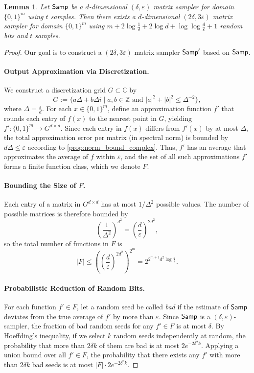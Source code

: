 \documentclass[10pt,a4paper]{article}
\newtheorem{lemma}[theorem]{Lemma}
\newcommand{\Z}{\mathbb{Z}}
\newcommand{\eps}{\varepsilon}
\newcommand{\1}{\mathbbm{1}}
\newcommand{\abs}[1]{\left|#1\right| }
\newcommand{\tuple}[1]{\left(#1\right)}
\newcommand{\zo}{\{0, 1\}}
\newcommand{\Smp}{\textup{\textsf{Samp}}}
\begin{document}
\begin{lemma}
    \label{lem:non_explicit_reduction}
    Let $\Smp$ be a $d$-dimensional $(\delta, \eps)$ matrix sampler for domain $\zo^m$ using $t$ samples. Then there exists a $d$-dimensional $(2\delta, 3\eps)$ matrix sampler for domain $\zo^m$ using $m + 2 \log \frac{1}{\delta} + 2 \log d + \log \log \frac{d}{\eps} + 1$ random bits and $t$ samples.
\end{lemma}
\begin{proof}
Our goal is to construct a $(2\delta, 3\eps)$ matrix sampler $\Smp'$ based on $\Smp$.
\paragraph{Output Approximation via Discretization.} 

We construct a discretization grid \( G \subset \mathbb{C} \) by \[
    G := \{a\Delta + b\Delta i \mid a, b \in \Z \text{ and } \abs{a}^2 + \abs{b}^2 \le \Delta^{-2}\},
\]
where $\Delta = \frac{\eps}{d}$.
For each \( x \in \{0,1\}^m \), define an approximation function \( f' \) that rounds each entry of \( f(x) \) to the nearest point in \( G \), yielding \( f' : \{0,1\}^m \to G^{d \times d} \). Since each entry in \( f(x) \) differs from \( f'(x) \) by at most \( \Delta \), the total approximation error per matrix (in spectral norm) is bounded by \( d\Delta \le \eps\) according to \cref{prop:norm_bound_complex}. Thus, \( f' \) has an average that approximates the average of \( f \) within \( \eps \), and the set of all such approximations \( f' \) forms a finite function class, which we denote \( F \).


\paragraph{Bounding the Size of \( F \).}
Each entry of a matrix in \( G^{d \times d} \) has at most \(1 / \Delta^2\)
possible values. The number of possible matrices is therefore bounded by
\[
\left( \frac{1}{\Delta^2} \right)^{d^2} = \tuple{\frac{d}{\eps}}^{2d^2},
\] 
so the total number of functions in \( F \) is 
\[
\abs{F} \le \left( \tuple{\frac{d}{\eps}}^{2d^2} \right)^{2^m} = 2^{2^{m+1}d^2\log\frac{d}{\eps}}.
\]

\paragraph{Probabilistic Reduction of Random Bits.}
For each function \( f' \in F \), let a random seed be called \textit{bad} if the estimate of \( \Smp \) deviates from the true average of \( f' \) by more than \( \eps \). Since \( \Smp \) is a \( (\delta, \eps) \)-sampler, the fraction of bad random seeds for any \( f' \in F \) is at most \( \delta \). By Hoeffding's inequality, if we select \( k \) random seeds independently at random, the probability that more than \( 2\delta k \) of them are bad is at most $
2e^{-2\delta^2 k}$.
Applying a union bound over all \( f' \in F \), the probability that there exists any \( f' \) with more than \( 2\delta k \) bad seeds is at most \( \abs{F} \cdot 2 e^{-2\delta^2 k} \).


\end{proof}
\end{document}
